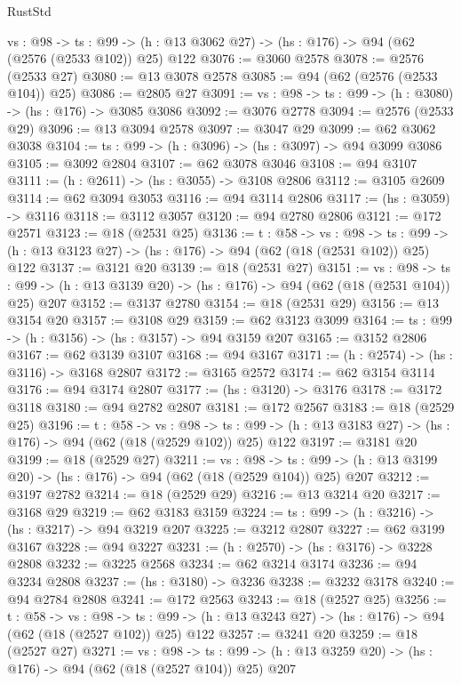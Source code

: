 \begin{lexlean}{RustStd}
\begin{coremodule}
{\begin{coremodule}
{{{{{{{{{  {vs : @98} ->
  {ts : @99} -> (h : @13 @3062 @27) -> (hs : @176) -> @94 (@62 (@2576 (@2533 @102)) @25) @122
@3076 := @3060 @2578
@3078 := @2576 (@2533 @27)
@3080 := @13 @3078 @2578
@3085 := @94 (@62 (@2576 (@2533 @104)) @25)
@3086 := @2805 @27
@3091 := {vs : @98} -> {ts : @99} -> (h : @3080) -> (hs : @176) -> @3085 @3086
@3092 := @3076 @2778
@3094 := @2576 (@2533 @29)
@3096 := @13 @3094 @2578
@3097 := @3047 @29
@3099 := @62 @3062 @3038
@3104 := {ts : @99} -> (h : @3096) -> (hs : @3097) -> @94 @3099 @3086
@3105 := @3092 @2804
@3107 := @62 @3078 @3046
@3108 := @94 @3107
@3111 := (h : @2611) -> (hs : @3055) -> @3108 @2806
@3112 := @3105 @2609
@3114 := @62 @3094 @3053
@3116 := @94 @3114 @2806
@3117 := (hs : @3059) -> @3116
@3118 := @3112 @3057
@3120 := @94 @2780 @2806
@3121 := @172 @2571
@3123 := @18 (@2531 @25)
@3136 := {t : @58} ->
  {vs : @98} ->
  {ts : @99} -> (h : @13 @3123 @27) -> (hs : @176) -> @94 (@62 (@18 (@2531 @102)) @25) @122
@3137 := @3121 @20
@3139 := @18 (@2531 @27)
@3151 := {vs : @98} ->
  {ts : @99} -> (h : @13 @3139 @20) -> (hs : @176) -> @94 (@62 (@18 (@2531 @104)) @25) @207
@3152 := @3137 @2780
@3154 := @18 (@2531 @29)
@3156 := @13 @3154 @20
@3157 := @3108 @29
@3159 := @62 @3123 @3099
@3164 := {ts : @99} -> (h : @3156) -> (hs : @3157) -> @94 @3159 @207
@3165 := @3152 @2806
@3167 := @62 @3139 @3107
@3168 := @94 @3167
@3171 := (h : @2574) -> (hs : @3116) -> @3168 @2807
@3172 := @3165 @2572
@3174 := @62 @3154 @3114
@3176 := @94 @3174 @2807
@3177 := (hs : @3120) -> @3176
@3178 := @3172 @3118
@3180 := @94 @2782 @2807
@3181 := @172 @2567
@3183 := @18 (@2529 @25)
@3196 := {t : @58} ->
  {vs : @98} ->
  {ts : @99} -> (h : @13 @3183 @27) -> (hs : @176) -> @94 (@62 (@18 (@2529 @102)) @25) @122
@3197 := @3181 @20
@3199 := @18 (@2529 @27)
@3211 := {vs : @98} ->
  {ts : @99} -> (h : @13 @3199 @20) -> (hs : @176) -> @94 (@62 (@18 (@2529 @104)) @25) @207
@3212 := @3197 @2782
@3214 := @18 (@2529 @29)
@3216 := @13 @3214 @20
@3217 := @3168 @29
@3219 := @62 @3183 @3159
@3224 := {ts : @99} -> (h : @3216) -> (hs : @3217) -> @94 @3219 @207
@3225 := @3212 @2807
@3227 := @62 @3199 @3167
@3228 := @94 @3227
@3231 := (h : @2570) -> (hs : @3176) -> @3228 @2808
@3232 := @3225 @2568
@3234 := @62 @3214 @3174
@3236 := @94 @3234 @2808
@3237 := (hs : @3180) -> @3236
@3238 := @3232 @3178
@3240 := @94 @2784 @2808
@3241 := @172 @2563
@3243 := @18 (@2527 @25)
@3256 := {t : @58} ->
  {vs : @98} ->
  {ts : @99} -> (h : @13 @3243 @27) -> (hs : @176) -> @94 (@62 (@18 (@2527 @102)) @25) @122
@3257 := @3241 @20
@3259 := @18 (@2527 @27)
@3271 := {vs : @98} ->
  {ts : @99} -> (h : @13 @3259 @20) -> (hs : @176) -> @94 (@62 (@18 (@2527 @104)) @25) @207
}}}}}}}}}
\end{coremodule}}
\end{coremodule}
\end{lexlean}
